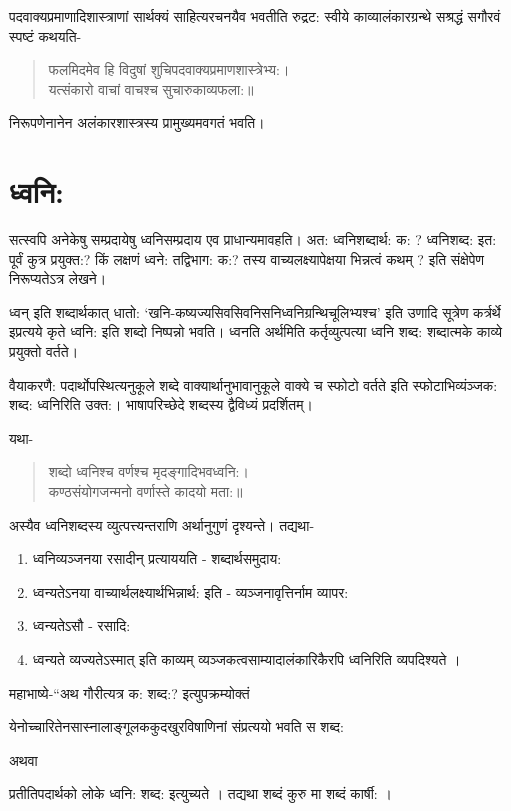 {पदवाक्यप्रमाणादिशास्त्राणां सार्थक्यं साहित्यरचनयैव भवतीति रुद्रट: स्वीये काव्यालंकारग्रन्थे सश्रद्धं सगौरवं स्पष्टं कथयति-
\begin{verse}
फलमिदमेव हि विदुषां शुचिपदवाक्यप्रमाणशास्त्रेभ्य:।\\
यत्संकारो वाचां वाचश्च सुचारुकाव्यफला:॥
\end{verse}
निरूपणेनानेन अलंकारशास्त्रस्य प्रामुख्यमवगतं भवति।

\section*{ध्वनि:}

सत्स्वपि अनेकेषु सम्प्रदायेषु ध्वनिसम्प्रदाय एव प्राधान्यमावहति। अत: ध्वनिशब्दार्थ: क: ? ध्वनिशब्द: इत: पूर्वं कुत्र प्रयुक्त:? किं लक्षणं ध्वने: तद्विभाग: क:? तस्य वाच्यलक्ष्यापेक्षया भिन्नत्वं कथम् ? इति संक्षेपेण निरूप्यतेऽत्र लेखने।

ध्वन् इति शब्दार्थकात् धातो: ‘खनि-कष्यज्यसिवसिवनिसनिध्वनिग्रन्थिचूलिभ्यश्च’ इति उणादि सूत्रेण कर्त्रर्थे इप्रत्यये कृते ध्वनि: इति शब्दो निष्पन्नो भवति। ध्वनति अर्थमिति कर्तृव्युत्पत्या ध्वनि शब्द: शब्दात्मके काव्ये प्रयुक्तो वर्तते।

वैयाकरणै: पदार्थोपस्थित्यनुकूले शब्दे वाक्यार्थानुभावानुकूले वाक्ये च स्फोटो वर्तते इति स्फोटाभिव्यंञ्जक: शब्द: ध्वनिरिति उक्त:। भाषापरिच्छेदे शब्दस्य द्वैविध्यं प्रदर्शितम्।

यथा-
\begin{verse}
शब्दो ध्वनिश्च वर्णश्च मृदङ्गादिभवध्वनि:।\\
कण्ठसंयोगजन्मनो वर्णास्ते कादयो मता:॥
\end{verse}
अस्यैव ध्वनिशब्दस्य व्युत्पत्त्यन्तराणि अर्थानुगुणं दृश्यन्ते। तद्यथा-
\begin{enumerate}
\item ध्वनिव्यञ्जनया रसादीन् प्रत्याययति - शब्दार्थसमुदाय:
\item ध्वन्यतेऽनया वाच्यार्थलक्ष्यार्थभिन्नार्थ: इति - व्यञ्जनावृत्तिर्नाम व्यापर: 
\item ध्वन्यतेऽसौ - रसादि:
\item ध्वन्यते व्यज्यतेऽस्मात् इति काव्यम् व्यञ्जकत्वसाम्यादालंकारिकैरपि ध्वनिरिति व्यपदिश्यते ।
\end{enumerate}
महाभाष्ये-“अथ गौरीत्यत्र क: शब्द:? इत्युपक्रम्योक्तं 

येनोच्चारितेनसास्नालाङ्गूलककुदखुरविषाणिनां संप्रत्ययो भवति स शब्द:

अथवा

प्रतीतिपदार्थको लोके ध्वनि: शब्द: इत्युच्यते । तद्यथा शब्दं कुरु मा शब्दं कार्षी: ।

}
